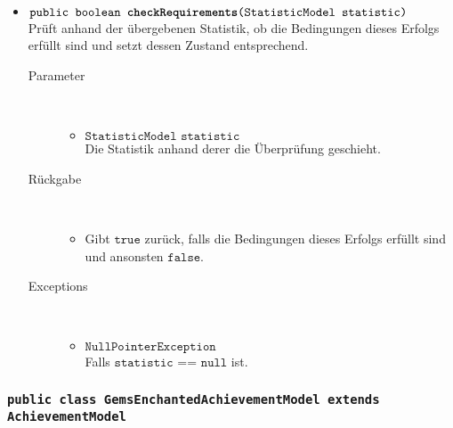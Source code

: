 \begin{description}
\begin{itemize}
		\item $\texttt{public boolean \textbf{checkRequirements}(StatisticModel statistic)}$ \\ Prüft anhand der übergebenen Statistik, ob die Bedingungen dieses Erfolgs erfüllt sind und setzt dessen Zustand entsprechend.
		\begin{description}
		\item[Parameter] \hfill \\
			\vspace{-.8cm}
			\begin{itemize}
				\item $\texttt{StatisticModel statistic}$ \\ Die Statistik anhand derer die Überprüfung geschieht. 
			\end{itemize}
			\item[Rückgabe] \hfill \\
			\vspace{-.8cm}
			\begin{itemize}
				\item Gibt $\texttt{true}$ zurück, falls die Bedingungen dieses Erfolgs erfüllt sind und ansonsten $\texttt{false}$.
			\end{itemize}
			\item[Exceptions] \hfill \\
			\vspace{-.8cm}
			\begin{itemize}
				\item $\texttt{NullPointerException}$ \\ Falls $\texttt{statistic == null}$ ist.
			\end{itemize}
		\end{description}		
		
	\end{itemize}
\end{description}

\subsubsection{\normalfont \texttt{public class \textbf{GemsEnchantedAchievementModel} extends AchievementModel}}


